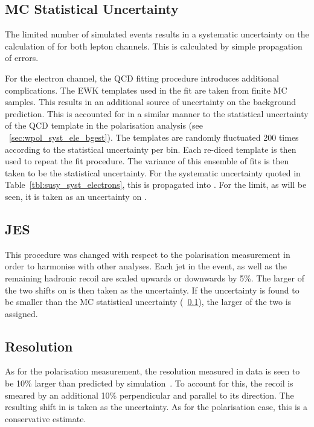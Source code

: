 \subsection{\acl{MC} Statistical Uncertainty}
\label{sec:susy_syst_mcstats}
The limited number of simulated events results in a systematic uncertainty on
the calculation of \RCS for both lepton channels. This is calculated by simple
propagation of errors.

For the electron channel, the \ac{QCD} fitting procedure introduces
additional complications. The \ac{EWK} templates used in the fit are
taken from finite \ac{MC} samples. This results in an additional
source of uncertainty on the background prediction. This is accounted
for in a similar manner to the statistical uncertainty of the \ac{QCD}
template in the \PW polarisation analysis (see
\sec~\ref{sec:wpol_syst_ele_bgest}). The templates are randomly
fluctuated 200 times according to the statistical uncertainty per
bin. Each re-diced template is then used to repeat the fit
procedure. The variance of this ensemble of fits is then taken to be
the statistical uncertainty. For the systematic uncertainty quoted in
Table~\ref{tbl:susy_syst_electrons}, this is propagated into \RCS. For
the limit, as will be seen, it is taken as an uncertainty on
\NControl.

\subsection{\acl{JES}}
\label{sec:susy_jes_uncertainty}
This procedure was changed with respect to the \PW polarisation measurement in
order to harmonise with other analyses. Each jet in the event, as well as the
remaining hadronic recoil are scaled upwards or downwards by 5\%. The larger of
the two shifts on \RCS is then taken as the uncertainty. If the uncertainty is
found to be smaller than the \ac{MC} statistical uncertainty
(\sec~\ref{sec:susy_syst_mcstats}), the larger of the two is assigned.

\subsection{\MET Resolution}
\label{sec:susy_metres_uncertainty}
As for the \PW polarisation measurement, the \MET resolution measured in data is
seen to be 10\% larger than predicted by simulation~\cite{cms_met_paper,
  cms_met_pas}. To account for this, the recoil is smeared by an additional 10\%
perpendicular and parallel to its direction. The resulting shift in \RCS is
taken as the uncertainty. As for the \PW polarisation case, this is a
conservative estimate.

